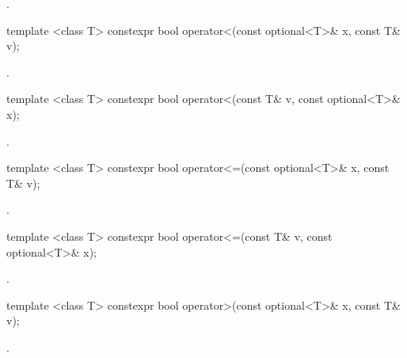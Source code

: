 \begin{itemdescr}
\pnum
\returns
{}.
\end{itemdescr}

%
\begin{itemdecl}
template <class T> constexpr bool operator<(const optional<T>& x, const T& v);
\end{itemdecl}

\begin{itemdescr}
\pnum
\returns
{}.
\end{itemdescr}

%
\begin{itemdecl}
template <class T> constexpr bool operator<(const T& v, const optional<T>& x);
\end{itemdecl}

\begin{itemdescr}
\pnum
\returns
{}.
\end{itemdescr}

%
\begin{itemdecl}
template <class T> constexpr bool operator<=(const optional<T>& x, const T& v);
\end{itemdecl}

\begin{itemdescr}
\pnum
\returns
{}.
\end{itemdescr}

%
\begin{itemdecl}
template <class T> constexpr bool operator<=(const T& v, const optional<T>& x);
\end{itemdecl}

\begin{itemdescr}
\pnum
\returns
{}.
\end{itemdescr}

%
\begin{itemdecl}
template <class T> constexpr bool operator>(const optional<T>& x, const T& v);
\end{itemdecl}

\begin{itemdescr}
\pnum
\returns
{}.
\end{itemdescr}

